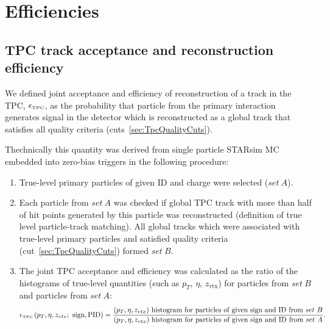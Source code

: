 

\chapter{Efficiencies}\label{chap:efficiencies}

\section{TPC track acceptance and reconstruction efficiency}\label{sec:tpcAccAndEff}
We defined joint acceptance and efficiency of reconstruction of a track in the TPC, $\epsilon_{\textrm{\tiny TPC}}$, as the probability that particle from the primary interaction generates signal in the detector which is reconstructed as a global track that satisfies all quality criteria (cuts~\ref{sec:TpcQualityCuts}).

Thechnically this quantity was derived from single particle STARsim MC embedded into zero-bias triggers in the following procedure:
\begin{enumerate}
	\item True-level primary particles of given ID and charge were selected ($set~A$).
	\item Each particle from $set~A$ was checked if global TPC track with more than half of hit points generated by this particle was reconstructed (definition of true level particle-track matching). All global tracks which were associated with true-level primary particles and satisfied quality criteria (cut~\ref{sec:TpcQualityCuts}) formed $set~B$.
	\item The joint TPC acceptance and efficiency was calculated as the ratio of the histograms of true-level quantities (such as $p_{T}$, $\eta$, $z_{\textrm{vtx}}$) for particles from $set~B$ and particles from $set~A$:
	\begin{equation}\label{eq:tpcAccAndEffDefinition}
		\epsilon_{\textrm{\tiny TPC}}\left(p_{T}, \eta, z_{vtx};~\textrm{sign},\textrm{PID}\right) = \frac{(p_{T},\eta, z_{vtx})~\textrm{histogram for particles of given sign and ID from}~set~B}{(p_{T},\eta, z_{vtx})~\textrm{histogram for particles of given sign and ID from}~set~A}.
	\end{equation}

\end{enumerate}

